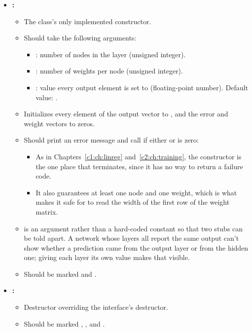 \begin{itemize}
  \item \textbf{:}
  \begin{itemize}
    \item The class's only implemented constructor.
    \item Should take the following arguments:
    \begin{itemize}
      \item {}: number of nodes in the layer (unsigned integer).
      \item {}: number of weights per node (unsigned integer).
      \item {}: value every output element is set to (floating-point number).
        Default value: .
    \end{itemize}
    \item Initializes every element of the output vector to , and the error and
      weight vectors to zeros.
    \item Should print an error message and call  if either
       or  is zero:
    \begin{itemize}
      \item As in Chapters~\ref{c1:ch:linreg} and~\ref{c2:ch:training}, the constructor is the one
        place that terminates, since it has no way to return a failure code.
      \item It also guarantees at least one node and one weight, which is what makes it safe for
         to read the width of the first row of the weight matrix.
    \end{itemize}
    \item {} is an argument rather than a hard-coded constant so that two stubs can
      be told apart. A network whose layers all report the same output can't show whether a
      prediction came from the output layer or from the hidden one; giving each layer its own value
      makes that visible.
    \item Should be marked  and .
  \end{itemize}
  \item \textbf{:}
  \begin{itemize}
    \item Destructor overriding the interface's destructor.
    \item Should be marked , , and .

\end{itemize}
\end{itemize}
